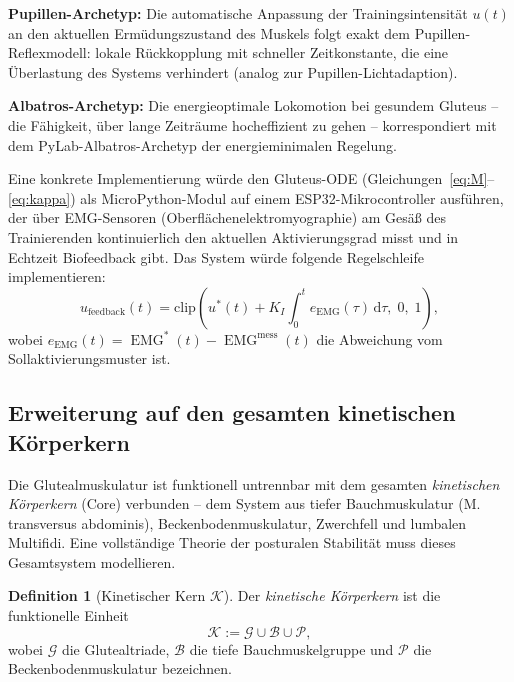 ﻿\documentclass[12pt,a4paper]{report}
\theoremstyle{plain}
\theoremstyle{definition}
\newtheorem{definition}[theorem]{Definition}
\theoremstyle{remark}
\DeclareMathOperator{\EMG}{EMG}
\begin{document}
	\textbf{Pupillen-Archetyp:}
	Die automatische Anpassung der Trainingsintensität $u(t)$ an den
	aktuellen Ermüdungszustand des Muskels folgt exakt dem
	Pupillen-Reflexmodell: lokale Rückkopplung mit schneller Zeitkonstante,
	die eine Überlastung des Systems verhindert (analog zur Pupillen-Lichtadaption).
	
	\textbf{Albatros-Archetyp:}
	Die energieoptimale Lokomotion bei gesundem Gluteus -- die Fähigkeit,
	über lange Zeiträume hocheffizient zu gehen -- korrespondiert mit dem
	PyLab-Albatros-Archetyp der energieminimalen Regelung.
	
	Eine konkrete Implementierung würde den Gluteus-ODE (Gleichungen~\eqref{eq:M}--\eqref{eq:kappa})
	als MicroPython-Modul auf einem ESP32-Mikrocontroller ausführen,
	der über EMG-Sensoren (Oberflächenelektromyographie) am Gesäß des
	Trainierenden kontinuierlich den aktuellen Aktivierungsgrad misst
	und in Echtzeit Biofeedback gibt. Das System würde folgende
	Regelschleife implementieren:
	\[
	u_{\mathrm{feedback}}(t) = \mathrm{clip}\!\left(
	u^*(t) + K_I \int_0^t e_{\EMG}(\tau)\,\mathrm{d}\tau,\; 0,\; 1\right),
	\]
	wobei $e_{\EMG}(t) = \EMG^*(t) - \EMG^{\mathrm{mess}}(t)$ die Abweichung
	vom Sollaktivierungsmuster ist.
	
	\subsection{Erweiterung auf den gesamten kinetischen Körperkern}
	\label{subsec:kern}
	
	Die Glutealmuskulatur ist funktionell untrennbar mit dem gesamten
	\emph{kinetischen Körperkern} (Core) verbunden -- dem System aus
	tiefer Bauchmuskulatur (M. transversus abdominis), Beckenbodenmuskulatur,
	Zwerchfell und lumbalen Multifidi. Eine vollständige Theorie der
	posturalen Stabilität muss dieses Gesamtsystem modellieren.
	
	\begin{definition}[Kinetischer Kern $\mathcal{K}$]
		\label{def:kern}
		Der \emph{kinetische Körperkern} ist die funktionelle Einheit
		\[
		\mathcal{K} := \mathcal{G} \cup \mathcal{B} \cup \mathcal{P},
		\]
		wobei $\mathcal{G}$ die Glutealtriade, $\mathcal{B}$ die tiefe
		Bauchmuskelgruppe und $\mathcal{P}$ die Beckenbodenmuskulatur bezeichnen.
	\end{definition}
	
\end{document}
